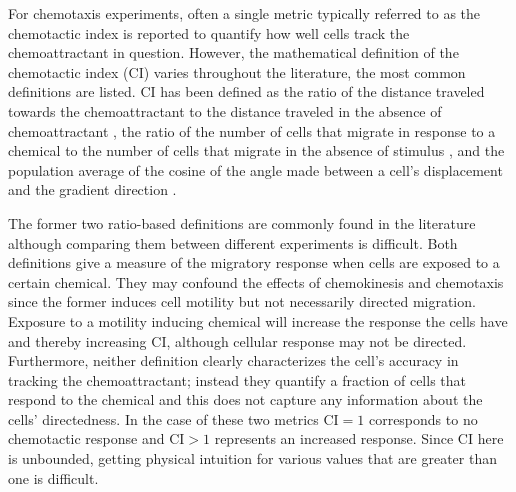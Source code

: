 For chemotaxis experiments, often a single metric typically referred to as the chemotactic index is reported to quantify how well cells track the chemoattractant in question. However, the mathematical definition of the chemotactic index (CI) varies throughout the literature, the most common definitions are listed. CI has been defined as the ratio of the distance traveled towards the chemoattractant to the distance traveled in the absence of chemoattractant \cite{nelson1975chemotaxis}, the ratio of the number of cells that migrate in response to a chemical to the number of cells that migrate in the absence of stimulus \cite{iellem2001unique,mayr2002vascular,fiedler2005vegf}, and the population average of the cosine of the angle made between a cell's displacement and the gradient direction
\cite{funamoto2001role,mouneimne2006spatial,van2007biased,kay2008changing}.

The former two ratio-based definitions are commonly found in the literature although comparing them between different experiments is difficult. Both definitions give a measure of the migratory response when cells are exposed to a certain chemical. They may confound the effects of chemokinesis and chemotaxis since the former induces cell motility but not necessarily directed migration. Exposure to a motility inducing chemical will increase the response the cells have and thereby increasing CI, although cellular response may not be directed. Furthermore, neither definition clearly characterizes the cell's accuracy in tracking the chemoattractant; instead they quantify a fraction of cells that respond to the chemical and this does not capture any information about the cells' directedness. In the case of these two metrics $\text{CI} = 1$ corresponds to no chemotactic response and $\text{CI} > 1$ represents an increased response. Since CI here is unbounded, getting physical intuition for various values that are greater than one is difficult.

